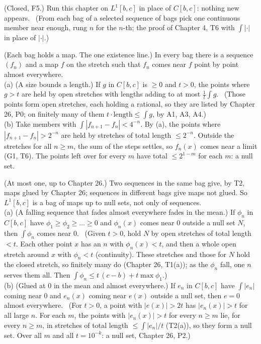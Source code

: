 \begin{lines}
\item[\lab{T1}] (Closed, F5.) Run this chapter on $L^1[b,c]$ in place of $C[b,c]$: nothing new appears. \ (From each bag of a selected sequence of bags pick one continuous member near enough, rung $n$ for the $n$-th; the proof of Chapter 4, T6 with $\int |\cdot|$ in place of $|\cdot|$.)
\item[\lab{T2}] (Each bag holds a map. The one existence line.) In every bag there is a sequence $(f_n)$ and a map $f$ on the stretch such that $f_n$ comes near $f$ point by point almost everywhere. \\
(a) (A size bounds a length.) If $g$ in $C[b,c]$ is $\ge 0$ and $t > 0$, the points where $g > t$ are held by open stretches with lengths adding to at most $\tfrac1t \int g$. \ (Those points form open stretches, each holding a rational, so they are listed by Chapter 26, P0; on finitely many of them $t \cdot \text{length} \le \int g$, by A1, A3, A4.) \\
(b) Take members with $\int |f_{n+1} - f_n| < 4^{-n}$. By (a), the points where $|f_{n+1} - f_n| > 2^{-n}$ are held by stretches of total length $\le 2^{-n}$. Outside the stretches for all $n \ge m$, the sum of the steps settles, so $f_n(x)$ comes near a limit (G1, T6). The points left over for every $m$ have total $\le 2^{1-m}$ for each $m$: a null set.
\item[\lab{T3}] (At most one, up to Chapter 26.) Two sequences in the same bag give, by T2, maps glued by Chapter 26; sequences in different bags give maps not glued. So $L^1[b,c]$ is a bag of maps up to null sets, not only of sequences. \\
(a) (A falling sequence that fades almost everywhere fades in the mean.) If $\phi_n$ in $C[b,c]$ have $\phi_1 \ge \phi_2 \ge \dots \ge 0$ and $\phi_n(x)$ comes near $0$ outside a null set $N$, then $\int \phi_n$ comes near $0$. \ (Given $t > 0$, hold $N$ by open stretches of total length $< t$. Each other point $x$ has an $n$ with $\phi_n(x) < t$, and then a whole open stretch around $x$ with $\phi_n < t$ (continuity). These stretches and those for $N$ hold the closed stretch, so finitely many do (Chapter 26, T1(a)); as the $\phi_n$ fall, one $n$ serves them all. Then $\int \phi_n \le t\,(c - b) + t \max \phi_1$.) \\
(b) (Glued at $0$ in the mean and almost everywhere.) If $e_n$ in $C[b,c]$ have $\int |e_n|$ coming near $0$ and $e_n(x)$ coming near $e(x)$ outside a null set, then $e = 0$ almost everywhere. \ (For $t > 0$, a point with $|e(x)| > 2t$ has $|e_n(x)| > t$ for all large $n$. For each $m$, the points with $|e_n(x)| > t$ for every $n \ge m$ lie, for every $n \ge m$, in stretches of total length $\le \int |e_n| / t$ (T2(a)), so they form a null set. Over all $m$ and all $t = 10^{-k}$: a null set, Chapter 26, P2.) \\

\end{lines}
